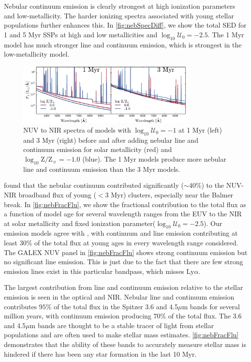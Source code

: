 \documentclass[trackchanges, twocolumn, tighten]{aastex61}
\newcommand{\Fig}[1]{\autoref{fig:#1}}
\newcommand{\logten}{\ensuremath{\log_{10}}}
\newcommand{\Lya}{\ensuremath{\mathrm{Ly}\alpha}}
\newcommand{\logZeq}[1]{\ensuremath{\logten \mathrm{Z}/\mathrm{Z}_{\sun} = #1}}
\newcommand{\logU}{\ensuremath{\logten \mathcal{U}_0}}
\begin{document}
Nebular continuum emission is clearly strongest at high ionization parameters and low-metallicity. The harder ionizing spectra associated with young stellar populations further enhances this. In \Fig{nebSpecDiff}, we show the total SED for 1 and 5 Myr SSPs at high and low metallicities and $\logU =-2.5$. The 1 Myr model has much stronger line and continuum emission, which is strongest in the low-metallicity model.

\begin{figure}
  \begin{centering}
    \includegraphics[width=0.8\textwidth]{f11.pdf}
    \caption{NUV to NIR spectra of models with $\logU=-1$ at 1 Myr (left) and 3 Myr (right) before and after adding nebular line and continuum emission for solar metallicity (red) and \logZeq{-1.0} (blue). The 1 Myr models produce more nebular line and continuum emission than the 3 Myr models.}
    \label{fig:nebSpecDiff}
  \end{centering}
\end{figure}

\citet{Reines10} found that the nebular continuum contributed significantly ($\sim40$\%) to the NUV-NIR broadband flux of young ($<3$ Myr) clusters, especially near the Balmer break. In \Fig{nebFracFlu}, we show the fractional contribution to the total flux as a function of model age for several wavelength ranges from the EUV to the NIR at solar metallicity and fixed ionization parameter($\logU=-2.5$). Our emission models agree with \citet{Reines10}, with continuum and line emission contributing at least 30\% of the total flux at young ages in every wavelength range considered. The GALEX NUV panel in \Fig{nebFracFlu} shows strong continuum emission but no significant line emission. This is just due to the fact that there are few strong emission lines exist in this particular bandpass, which misses \Lya.

The largest contribution from line and continuum emission relative to the stellar emission is seen in the optical and NIR. Nebular line and continuum emission contributes $95\%$ of the total flux in the Spitzer 3.6 and 4.5$\mu$m bands for several million years, with continuum emission producing $70\%$ of the total flux. The 3.6 and 4.5$\mu$m bands are thought to be a stable tracer of light from stellar populations and are often used to make stellar mass estimates. \Fig{nebFracFlu} demonstrates that the ability of these bands to accurately measure stellar mass is hindered if there has been any star formation in the last 10 Myr.
\end{document}
